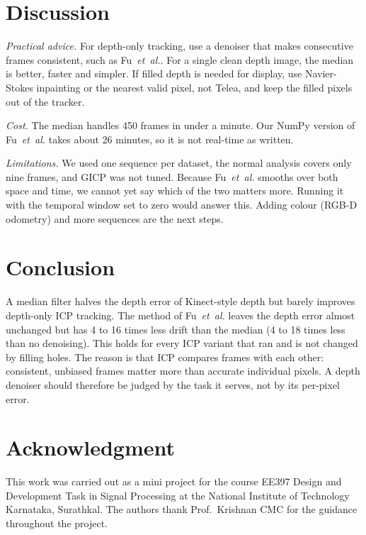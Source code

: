 \documentclass[conference]{IEEEtran}
\newcommand{\fu}{Fu~\emph{et~al.}}
\begin{document}
\section{Discussion}

\emph{Practical advice.} For depth-only tracking, use a denoiser that makes
consecutive frames consistent, such as \fu{}. For a single clean depth image,
the median is better, faster and simpler. If filled depth is needed for
display, use Navier-Stokes inpainting or the nearest valid pixel, not Telea,
and keep the filled pixels out of the tracker.

\emph{Cost.} The median handles 450 frames in under a minute. Our NumPy
version of \fu{} takes about 26 minutes, so it is not real-time as written.

\emph{Limitations.} We used one sequence per dataset, the normal analysis
covers only nine frames, and GICP was not tuned. Because \fu{} smooths over
both space and time, we cannot yet say which of the two matters more. Running
it with the temporal window set to zero would answer this. Adding colour
(RGB-D odometry) and more sequences are the next steps.

\section{Conclusion}

A median filter halves the depth error of Kinect-style depth but barely
improves depth-only ICP tracking. The method of \fu{} leaves the depth error
almost unchanged but has 4 to 16 times less drift than the median (4 to 18
times less than no denoising). This holds for every ICP variant that ran and
is not changed by filling holes. The reason is that ICP compares frames with
each other: consistent, unbiased frames matter more than accurate individual
pixels. A depth denoiser should therefore be judged by the task it serves, not
by its per-pixel error.

\section*{Acknowledgment}

This work was carried out as a mini project for the course EE397 Design and
Development Task in Signal Processing at the National Institute of Technology
Karnataka, Surathkal. The authors thank Prof.~Krishnan CMC for the guidance
throughout the project.
\end{document}
